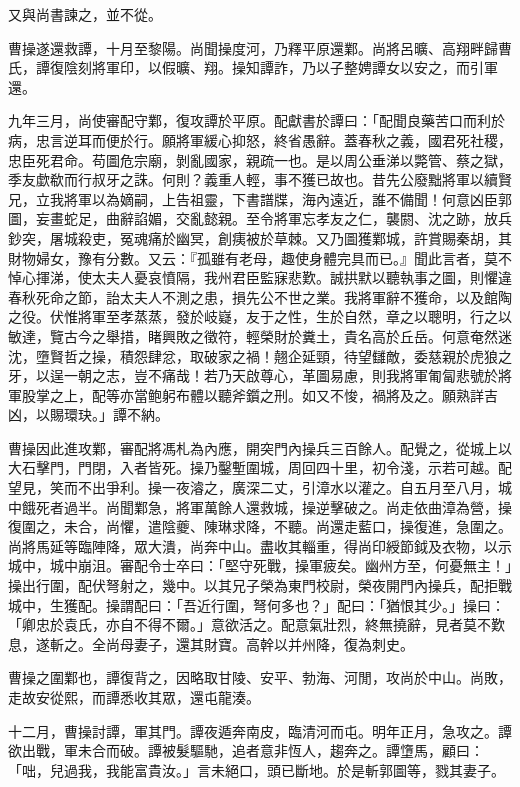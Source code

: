 \begin{pinyinscope}
又與尚書諫之，並不從。

曹操遂還救譚，十月至黎陽。尚聞操度河，乃釋平原還鄴。尚將呂曠、高翔畔歸曹氏，譚復陰刻將軍印，以假曠、翔。操知譚詐，乃以子整娉譚女以安之，而引軍還。

九年三月，尚使審配守鄴，復攻譚於平原。配獻書於譚曰：「配聞良藥苦口而利於病，忠言逆耳而便於行。願將軍緩心抑怒，終省愚辭。蓋春秋之義，國君死社稷，忠臣死君命。苟圖危宗廟，剝亂國家，親疏一也。是以周公垂涕以斃管、蔡之獄，季友歔欷而行叔牙之誅。何則？義重人輕，事不獲已故也。昔先公廢黜將軍以續賢兄，立我將軍以為嫡嗣，上告祖靈，下書譜牒，海內遠近，誰不備聞！何意凶臣郭圖，妄畫蛇足，曲辭諂媚，交亂懿親。至令將軍忘孝友之仁，襲閼、沈之跡，放兵鈔突，屠城殺吏，冤魂痛於幽冥，創痍被於草棘。又乃圖獲鄴城，許賞賜秦胡，其財物婦女，豫有分數。又云：『孤雖有老母，趣使身體完具而已。』聞此言者，莫不悼心揮涕，使太夫人憂哀憤隔，我州君臣監寐悲歎。誠拱默以聽執事之圖，則懼違春秋死命之節，詒太夫人不測之患，損先公不世之業。我將軍辭不獲命，以及館陶之役。伏惟將軍至孝蒸蒸，發於岐嶷，友于之性，生於自然，章之以聰明，行之以敏達，覽古今之舉措，睹興敗之徵符，輕榮財於糞土，貴名高於丘岳。何意奄然迷沈，墮賢哲之操，積怨肆忿，取破家之禍！翹企延頸，待望讎敵，委慈親於虎狼之牙，以逞一朝之志，豈不痛哉！若乃天啟尊心，革圖易慮，則我將軍匍匐悲號於將軍股掌之上，配等亦當鲍躬布體以聽斧鑕之刑。如又不悛，禍將及之。願熟詳吉凶，以賜環玦。」譚不納。

曹操因此進攻鄴，審配將馮札為內應，開突門內操兵三百餘人。配覺之，從城上以大石擊門，門閉，入者皆死。操乃鑿塹圍城，周回四十里，初令淺，示若可越。配望見，笑而不出爭利。操一夜濬之，廣深二丈，引漳水以灌之。自五月至八月，城中餓死者過半。尚聞鄴急，將軍萬餘人還救城，操逆擊破之。尚走依曲漳為營，操復圍之，未合，尚懼，遣陰夔、陳琳求降，不聽。尚還走藍口，操復進，急圍之。尚將馬延等臨陣降，眾大潰，尚奔中山。盡收其輜重，得尚印綬節鉞及衣物，以示城中，城中崩沮。審配令士卒曰：「堅守死戰，操軍疲矣。幽州方至，何憂無主！」操出行圍，配伏弩射之，幾中。以其兄子榮為東門校尉，榮夜開門內操兵，配拒戰城中，生獲配。操謂配曰：「吾近行圍，弩何多也？」配曰：「猶恨其少。」操曰：「卿忠於袁氏，亦自不得不爾。」意欲活之。配意氣壯烈，終無撓辭，見者莫不歎息，遂斬之。全尚母妻子，還其財寶。高幹以并州降，復為刺史。

曹操之圍鄴也，譚復背之，因略取甘陵、安平、勃海、河閒，攻尚於中山。尚敗，走故安從熙，而譚悉收其眾，還屯龍湊。

十二月，曹操討譚，軍其門。譚夜遁奔南皮，臨清河而屯。明年正月，急攻之。譚欲出戰，軍未合而破。譚被髮驅馳，追者意非恆人，趨奔之。譚墯馬，顧曰：「咄，兒過我，我能富貴汝。」言未絕口，頭已斷地。於是斬郭圖等，戮其妻子。


\end{pinyinscope}
